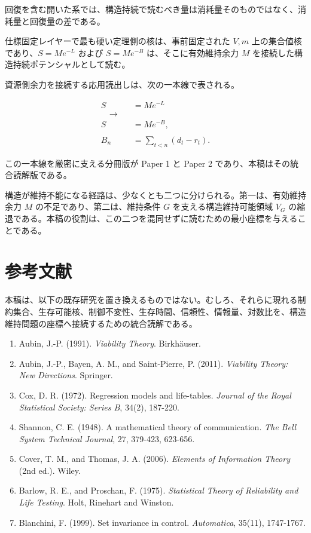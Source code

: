 \documentclass[12pt,a4paper]{article}
\begin{document}
回復を含む開いた系では、構造持続で読むべき量は消耗量そのものではなく、消耗量と回復量の差である。

仕様固定レイヤーで最も硬い定理側の核は、事前固定された \(V,m\) 上の集合値核であり、\(S=Me^{-L}\) および \(S=Me^{-B}\) は、そこに有効維持余力 \(M\) を接続した構造持続ポテンシャルとして読む。

資源側余力を接続する応用読出しは、次の一本線で表される。

\[
\begin{aligned}
S&=Me^{-L} \\
\quad\longrightarrow\quad \\
S&=Me^{-B}, \\
\qquad \\
B_{n}&=\sum_{t<n}(d_{t}-r_{t}).
\end{aligned}
\]

この一本線を厳密に支える分冊版が Paper 1 と Paper 2 であり、本稿はその統合読解版である。

構造が維持不能になる経路は、少なくとも二つに分けられる。第一は、有効維持余力 \(M\) の不足であり、第二は、維持条件 \(G\) を支える構造維持可能領域 \(V_{G}\) の縮退である。本稿の役割は、この二つを混同せずに読むための最小座標を与えることである。

\section{参考文献}\label{ux53c2ux8003ux6587ux732e}

本稿は、以下の既存研究を置き換えるものではない。むしろ、それらに現れる制約集合、生存可能核、制御不変性、生存時間、信頼性、情報量、対数比を、構造維持問題の座標へ接続するための統合読解である。

\begin{enumerate}
\def\labelenumi{\arabic{enumi}.}
\tightlist
\item
  Aubin, J.-P. (1991). \emph{Viability Theory}. Birkhäuser.
\item
  Aubin, J.-P., Bayen, A. M., and Saint-Pierre, P. (2011). \emph{Viability Theory: New Directions}. Springer.
\item
  Cox, D. R. (1972). Regression models and life-tables. \emph{Journal of the Royal Statistical Society: Series B}, 34(2), 187-220.
\item
  Shannon, C. E. (1948). A mathematical theory of communication. \emph{The Bell System Technical Journal}, 27, 379-423, 623-656.
\item
  Cover, T. M., and Thomas, J. A. (2006). \emph{Elements of Information Theory} (2nd ed.). Wiley.
\item
  Barlow, R. E., and Proschan, F. (1975). \emph{Statistical Theory of Reliability and Life Testing}. Holt, Rinehart and Winston.
\item
  Blanchini, F. (1999). Set invariance in control. \emph{Automatica}, 35(11), 1747-1767.
\end{enumerate}
\end{document}

